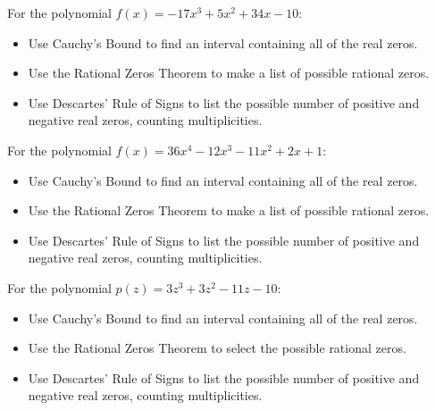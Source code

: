 \documentclass{ximera}
\begin{document}
\begin{problem}
For the polynomial $f(x) = -17x^{3} + 5x^{2} + 34x - 10$:

\begin{itemize}
\item  Use Cauchy's Bound to find an interval containing all of the real zeros.
\item  Use the Rational Zeros Theorem to make a list of possible rational zeros.
\item  Use Descartes' Rule of Signs to list the possible number of positive and negative real zeros, counting multiplicities.
\end{itemize}
\end{problem}

\begin{problem}
For the polynomial $f(x) = 36x^{4} - 12x^{3} - 11x^{2} + 2x + 1$:

\begin{itemize}
\item  Use Cauchy's Bound to find an interval containing all of the real zeros.
\item  Use the Rational Zeros Theorem to make a list of possible rational zeros.
\item  Use Descartes' Rule of Signs to list the possible number of positive and negative real zeros, counting multiplicities.
\end{itemize}
\end{problem}

\begin{problem}
For the polynomial $p(z) = 3z^{3} + 3z^{2} - 11z - 10$:

\begin{itemize}
\item  Use Cauchy's Bound to find an interval containing all of the real zeros.
\item  Use the Rational Zeros Theorem to select the possible rational zeros.
\begin{selectAll}
  \end{selectAll}
\item  Use Descartes' Rule of Signs to list the possible number of positive and negative real zeros, counting multiplicities.
\end{itemize}
\end{problem}
\end{document}
